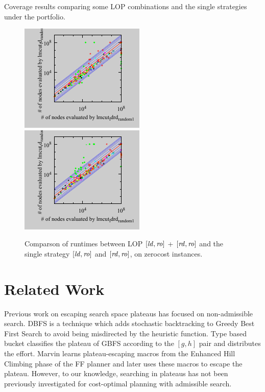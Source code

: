 \begin{table}[tb]
 \centering {}
 
 \caption{Coverage results comparing some LOP combinations and the
 single strategies under the portfolio. }
 \label{portfolio-coverage}
\end{table}


\begin{figure}[tb]
 \centering
 \includegraphics{tables/aaai16-30min/zerocost/evaluated-nokey-lmcut_ldrd_random-lmcut_ld_random.pdf}
 \includegraphics{tables/aaai16-30min/zerocost/evaluated-nokey-lmcut_ldrd_random-lmcut_rd_random.pdf}
 \caption{Comparson of runtimes between LOP $[\mbox{\textit{ld}},\mbox{\textit{ro}}]$ +
 $[\mbox{\textit{rd}},\mbox{\textit{ro}}]$ and the single strategy $[\mbox{\textit{ld}},\mbox{\textit{ro}}]$ and $[\mbox{\textit{rd}},\mbox{\textit{ro}}]$, on
 zerocost instances.}  \label{portfolio-runtime}
\end{figure}


\section{Related Work}
\label{sec-4}

Previous work on escaping search space plateaus has focused on
non-admissible search.  DBFS \cite{imai2011novel} is a technique which
adds stochastic backtracking to Greedy Best First Search to avoid
being misdirected by the heuristic function. Type based bucket
\cite{xie14type} classifies the plateau of GBFS according to the
$[g,h]$ pair and distributes the effort.  Marvin \cite{Coles07} learns plateau-escaping macros
from the Enhanced Hill Climbing phase of the FF planner
\cite{Hoffmann01} and later uses these macros to escape the plateau.
However, to our knowledge, searching in plateaus has not been
previously investigated for cost-optimal planning with admissible
search.

